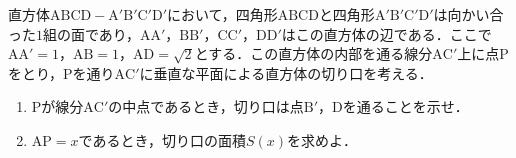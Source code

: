 \documentclass[../../main.tex]{subfiles}
\begin{document}
直方体$\mathrm{ABCD}-\mathrm{A'B'C'D'}$において，四角形$\mathrm{ABCD}$と四角形$\mathrm{A'B'C'D'}$は向かい合った$1$組の面であり，$\mathrm{AA'}$，$\mathrm{BB'}$，$\mathrm{CC'}$，$\mathrm{DD'}$はこの直方体の辺である．ここで$\mathrm{AA'}=1$，$\mathrm{AB}=1$，$\mathrm{AD}=\sqrt{2}$とする．この直方体の内部を通る線分$\mathrm{AC'}$上に点$\mathrm{P}$をとり，$\mathrm{P}$を通り$\mathrm{AC'}$に垂直な平面による直方体の切り口を考える．
\begin{enumerate}
  \item $\mathrm{P}$が線分$\mathrm{AC'}$の中点であるとき，切り口は点$\mathrm{B'}$，$\mathrm{D}$を通ることを示せ．
  \item $\mathrm{AP}=x$であるとき，切り口の面積$S(x)$を求めよ．
\end{enumerate}
\end{document}
